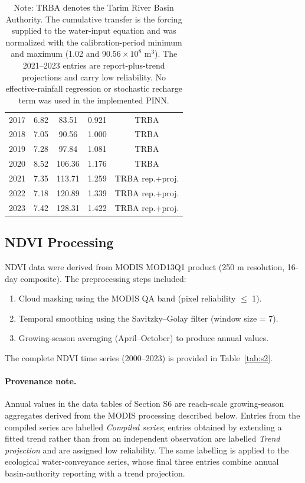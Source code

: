 \documentclass[12pt,a4paper]{article}
\begin{document}
\begin{table}[H]
\begin{tabular}{ccccc}
			2017 & 6.82 & 83.51 & 0.921 & TRBA \\
			2018 & 7.05 & 90.56 & 1.000 & TRBA \\
			2019 & 7.28 & 97.84 & 1.081 & TRBA \\
			2020 & 8.52 & 106.36 & 1.176 & TRBA \\
			2021 & 7.35 & 113.71 & 1.259 & TRBA rep.+proj. \\
			2022 & 7.18 & 120.89 & 1.339 & TRBA rep.+proj. \\
			2023 & 7.42 & 128.31 & 1.422 & TRBA rep.+proj. \\
		\bottomrule
	\end{tabular}
	\caption*{Note: TRBA denotes the Tarim River Basin Authority. The cumulative transfer is the forcing supplied to the water-input equation and was normalized with the calibration-period minimum and maximum (1.02 and $90.56\times10^{8}$ m$^{3}$). The 2021--2023 entries are report-plus-trend projections and carry low reliability. No effective-rainfall regression or stochastic recharge term was used in the implemented PINN.}
\end{table}



\subsection{NDVI Processing}

NDVI data were derived from MODIS MOD13Q1 product (250 m resolution, 16-day composite). The preprocessing steps included:

\begin{enumerate}
	\item Cloud masking using the MODIS QA band (pixel reliability $\le$ 1).
	\item Temporal smoothing using the Savitzky--Golay filter (window size = 7).
	\item Growing-season averaging (April--October) to produce annual values.
\end{enumerate}

The complete NDVI time series (2000--2023) is provided in Table~\ref{tab:s2}.

\paragraph{Provenance note.} Annual values in the data tables of Section S6 are
reach-scale growing-season aggregates derived from the MODIS processing
described below. Entries from the compiled series are labelled \emph{Compiled series}; entries
obtained by extending a fitted trend rather than from an independent
observation are labelled \emph{Trend projection} and are assigned low
reliability. The same labelling is applied to the ecological
water-conveyance series, whose final three entries combine annual
basin-authority reporting with a trend projection.
\end{document}
